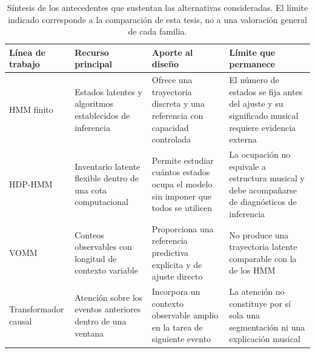 \begin{table}[H]
\centering
\caption{Síntesis de los antecedentes que sustentan las alternativas consideradas. El límite indicado corresponde a la comparación de esta tesis, no a una valoración general de cada familia.}
\label{tab:chapter0-state-of-art}
\footnotesize
\setlength{\tabcolsep}{3.5pt}
\renewcommand{\arraystretch}{1.16}
\begin{tabular}{p{} p{} p{} p{}}
\hline
Línea de trabajo & Recurso principal & Aporte al diseño & Límite que permanece \tabularnewline
\hline
HMM finito \cite{rabiner1989,cappe2005,sheh2003} & Estados latentes y algoritmos establecidos de inferencia & Ofrece una trayectoria discreta y una referencia con capacidad controlada & El número de estados se fija antes del ajuste y su significado musical requiere evidencia externa \tabularnewline
HDP-HMM \cite{teh2006,fox2011} & Inventario latente flexible dentro de una cota computacional & Permite estudiar cuántos estados ocupa el modelo sin imponer que todos se utilicen & La ocupación no equivale a estructura musical y debe acompañarse de diagnósticos de inferencia \tabularnewline
VOMM \cite{begleiter2004} & Conteos observables con longitud de contexto variable & Proporciona una referencia predictiva explícita y de ajuste directo & No produce una trayectoria latente comparable con la de los HMM \tabularnewline
Transformador causal \cite{vaswani2017,huang2018musictransformer} & Atención sobre los eventos anteriores dentro de una ventana & Incorpora un contexto observable amplio en la tarea de siguiente evento & La atención no constituye por sí sola una segmentación ni una explicación musical \tabularnewline
\hline
\end{tabular}
\end{table}
